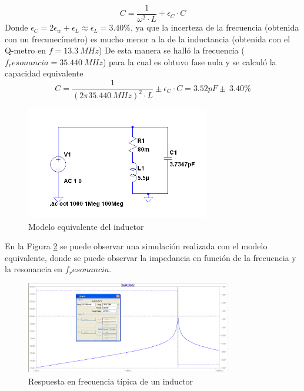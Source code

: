 \documentclass[a4paper,10pt]{article}
\begin{document}
		$$C=\frac{1}{\omega^2 \cdot L}+\epsilon_C \cdot C$$
		Donde $\epsilon_C=2\epsilon_w+\epsilon_L\approx \epsilon_L =3.40\%$, ya que la incerteza de la frecuencia (obtenida con un frecunec\'imetro) es mucho menor a la de la inductancia (obtenida con el Q-metro en $f=13.3~MHz$)
		De esta manera se hall\'o la frecuencia ($f_resonancia=35.440~MHz$) para la cual es obtuvo fase nula y se calcul\'o la capacidad equivalente
		$$C=\frac{1}{(2\pi 35.440~MHz)^2 \cdot L}\pm \epsilon_C \cdot C=3.52pF \pm~3.40\%$$
			\begin{figure}[!htb]
				\centering
				\includegraphics[width=8cm]
				{Imagenes/induceqquiv.png}
				\caption{Modelo equivalente del inductor}
				\label{inductorequiv} 
			\end{figure}
			En la Figura \ref{respfreq} se puede observar una simulaci\'on realizada con el modelo equivalente, donde se puede observar la impedancia en funci\'on de la frecuencia y la resonancia en $f_resonancia$.
			\begin{figure}[!htb]
				\centering
				\includegraphics[width=9cm]
				{Imagenes/respfreq.png}
				\caption{Respuesta en frecuencia t\'ipica de un inductor}
				\label{respfreq} 
			\end{figure}
\end{document}
